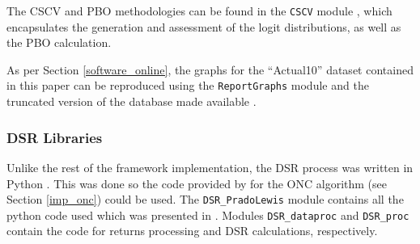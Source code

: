 \documentclass[a4paper,11pt,oneside]{article}
\theoremstyle{plain}
\theoremstyle{definition}
\begin{document}
	The CSCV and PBO methodologies can be found in the \texttt{CSCV} module \citep{DCCSCV}, which encapsulates the generation and assessment of the logit distributions, as well as the PBO calculation.\newline

	As per Section \ref{software_online}, the graphs for the ``Actual10'' dataset contained in this paper can be reproduced using the \texttt{ReportGraphs} module \citep{DCReportGraphs} and the truncated version of the database made available \citep{DCAggregatedDatabase}.
	
	\subsubsection{DSR Libraries}
	
	Unlike the rest of the framework implementation, the DSR process was written in Python \citep{Python}. This was done so the code provided by \citet{PradoDSR} for the ONC algorithm (see Section \ref{imp_onc}) could be used. The \texttt{DSR\_PradoLewis} module \citep{DCDSR_PradoLewis} contains all the python code used which was presented in \citep{PradoDSR}. Modules \texttt{DSR\_dataproc} \citep{DCDSR_Dataproc} and \texttt{DSR\_proc} \citep{DCDSR_proc} contain the code for returns processing and DSR calculations, respectively.
	
\end{document}
